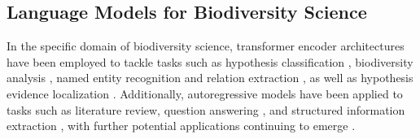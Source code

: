 \subsection{Language Models for Biodiversity Science}

In the specific domain of biodiversity science, transformer encoder architectures have been employed to tackle tasks such as hypothesis classification \cite{brinner-etal-2022-linking}, biodiversity analysis \cite{barcodebert}, named entity recognition and relation extraction \cite{abdelmageed2023biodivbert}, as well as hypothesis evidence localization \cite{weakClaims, brinner-zarriess-2024-rationalizing}. Additionally, autoregressive models have been applied to tasks such as literature review, question answering \cite{biodiversity_LLM}, and structured information extraction \cite{structuredExtractionEcology, infoextractBiodiv}, with further potential applications continuing to emerge \cite{osawa2023role}.